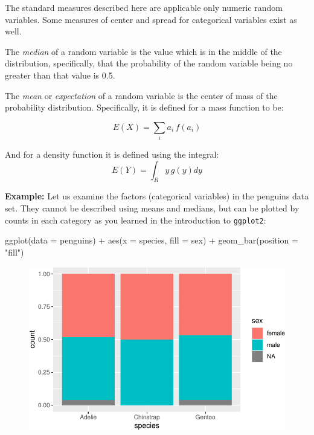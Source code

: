 \documentclass[
  letterpaper,
  DIV=11,
  numbers=noendperiod]{scrreprt}
\newenvironment{Shaded}{\begin{snugshade}}{\end{snugshade}}
\newcommand{\AttributeTok}[1]{\textcolor[rgb]{0.40,0.45,0.13}{#1}}
\newcommand{\FunctionTok}[1]{\textcolor[rgb]{0.28,0.35,0.67}{#1}}
\newcommand{\NormalTok}[1]{\textcolor[rgb]{0.00,0.23,0.31}{#1}}
\newcommand{\SpecialCharTok}[1]{\textcolor[rgb]{0.37,0.37,0.37}{#1}}
\newcommand{\StringTok}[1]{\textcolor[rgb]{0.13,0.47,0.30}{#1}}
\begin{document}
The standard measures described here are applicable only numeric random
variables. Some measures of center and spread for categorical variables
exist as well.

The \emph{median} of a random variable is the value which is in the
middle of the distribution, specifically, that the probability of the
random variable being no greater than that value is 0.5.

The \emph{mean} or \emph{expectation} of a random variable is the center
of mass of the probability distribution. Specifically, it is defined for
a mass function to be:

\[ E(X) = \sum_i a_i\, f(a_i)\]

And for a density function it is defined using the integral:
\[ E(Y) =  \int_R y\, g(y) dy \]

\textbf{Example:} Let us examine the factors (categorical variables) in
the penguins data set. They cannot be described using means and medians,
but can be plotted by counts in each category as you learned in the
introduction to \texttt{ggplot2}:

\begin{Shaded}
\begin{Highlighting}[]
\FunctionTok{ggplot}\NormalTok{(}\AttributeTok{data =}\NormalTok{ penguins) }\SpecialCharTok{+}
  \FunctionTok{aes}\NormalTok{(}\AttributeTok{x =}\NormalTok{ species, }\AttributeTok{fill =}\NormalTok{ sex) }\SpecialCharTok{+} 
  \FunctionTok{geom\_bar}\NormalTok{(}\AttributeTok{position =} \StringTok{"fill"}\NormalTok{)}
\end{Highlighting}
\end{Shaded}

\begin{figure}[H]

{\centering \includegraphics{./02-probdist_files/figure-pdf/unnamed-chunk-2-1.pdf}

}

\end{figure}
\end{document}
